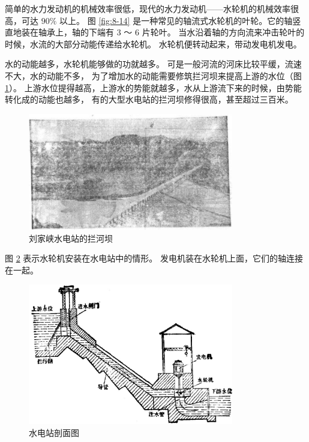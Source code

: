 简单的水力发动机的机械效率很低，现代的水力发动机——水轮机的机械效率很高，可达 $90\%$ 以上。
图 \ref{fig:8-14} 是一种常见的轴流式水轮机的叶轮。它的轴竖直地装在轴承上，轴的下端有 3 ～ 6 片轮叶。
当水沿着轴的方向流来冲击轮叶的时候，水流的大部分动能传递给水轮机。
水轮机便转动起来，带动发电机发电。

水的动能越多，水轮机能够做的功就越多。
可是一般河流的河床比较平缓，流速不大，水的动能不多，
为了增加水的动能需要修筑拦河坝来提高上游的水位（图 \ref{fig:8-15}）。
上游水位提得越高，上游水的势能就越多，水从上游流下来的时候，由势能转化成的动能也越多，
有的大型水电站的拦河坝修得很高，甚至超过三百米。

\begin{figure}[htbp]
    \centering
    \includegraphics[width=0.8\textwidth]{../pic/czwl1-ch8-15}
    \caption{刘家峡水电站的拦河坝}\label{fig:8-15}
\end{figure}


图 \ref{fig:8-16} 表示水轮机安装在水电站中的情形。
发电机装在水轮机上面，它们的轴连接在一起。

\begin{figure}[htbp]
    \centering
    \includegraphics[width=0.8\textwidth]{../pic/czwl1-ch8-16}
    \caption{水电站剖面图}\label{fig:8-16}
\end{figure}


